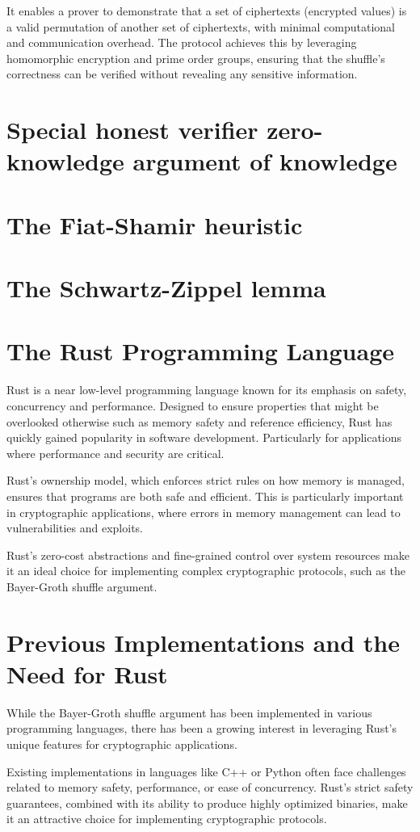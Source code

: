 \documentclass[12pt,a4paper]{report}
\begin{document}
It enables a prover to demonstrate that a set of ciphertexts (encrypted values) is a valid 
permutation of another set of ciphertexts, with minimal computational and communication overhead.
The protocol achieves this by leveraging homomorphic encryption and prime order groups, ensuring that the shuffle's correctness can be verified without revealing any sensitive information.

\section{Special honest verifier zero-knowledge argument of knowledge}

\section{The Fiat-Shamir heuristic}

\section{The Schwartz-Zippel lemma}

\section{The Rust Programming Language}
Rust\cite{rust} is a near low-level programming language known for its emphasis on safety, concurrency and performance.
Designed to ensure properties that might be overlooked otherwise such as memory safety and
reference efficiency, Rust has quickly gained popularity in software development. 
Particularly for applications where performance and security are critical.\par
Rust's ownership model, which enforces strict rules on how memory is managed, ensures that programs
are both safe and efficient\cite{rust}. This is particularly important in cryptographic applications,
where errors in memory management can lead to vulnerabilities and exploits.\par
Rust's zero-cost abstractions and fine-grained control over system resources make it an ideal
choice for implementing complex cryptographic protocols, such as the Bayer-Groth shuffle argument.
\section{Previous Implementations and the Need for Rust}
While the Bayer-Groth shuffle argument has been implemented in various programming languages, 
there has been a growing interest in leveraging Rust’s unique features for cryptographic applications. \par
Existing implementations in languages like C++ or Python often face challenges related to memory safety, performance, or ease of concurrency. 
Rust’s strict safety guarantees, combined with its ability to produce highly optimized binaries, make it an attractive choice for implementing cryptographic protocols.
\end{document}
